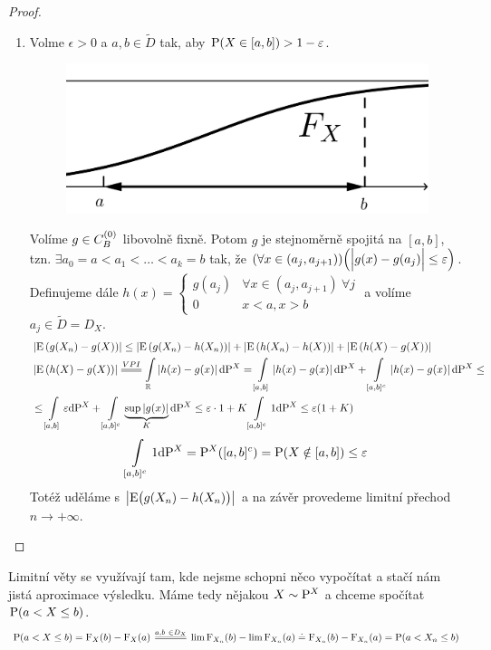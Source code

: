 \begin{theorem}
\begin{proof}
\begin{enumerate}[	$\Rightarrow$:]
		\end{enumerate}
	\begin{enumerate}[	$\Leftarrow$:]
	\item Volme $\epsilon>0$ a $a,b\in\tilde{D}$ tak, aby $\PP(X\in[a,b])>1-\epsilon$.
		\begin{figure}[h]
		\centering
		\includegraphics[width=0.3\linewidth]{veta3}
		\label{fig:veta3}
	\end{figure}
	 Volíme $g\in\CB$ libovolně fixně. Potom $g$ je stejnoměrně spojitá na $[a,b]$, tzn. $\exists a_0=a<a_1<\dots<a_k=b$ tak, že $(\forall x\in(a_j,a_{j+1}))\Bigl( \Bigl| g(x)-g(a_j) \Bigr|\leq \epsilon \Bigr)$. Definujeme dále $h(x)=\begin{cases}
	g(a_j) &\forall x\in(a_j,a_{j+1})~ \forall j \\ 0 & x<a,x>b
	\end{cases}$ a volíme $a_j\in\tilde{D}=D_X$.
	\[
	\begin{split}
	&\left| \E \left( g(X_n)-g(X) \right) \right|\leq \left| \E \left( g(X_n)-h(X_n) \right) \right|+ \left| \E \left( h(X_n)-h(X) \right) \right|+\left| \E \left( h(X)-g(X) \right) \right| \\ 
	& \left| \E \left( h(X)-g(X) \right) \right|\equal{VPI}\int\limits_{\R} \left| h(x)-g(x) \right|\dif\PP^X=\int\limits_{[a,b]}\left| h(x)-g(x) \right|\dif\PP^X+\int\limits_{[a,b]^c}\left| h(x)-g(x) \right|\dif\PP^X \leq \\ &\leq\int\limits_{[a,b]}\epsilon \dif\PP^X+\int\limits_{[a,b]^c}\underbrace{\sup|g(x)|}_{K}\dif\PP^X\leq \epsilon\cdot 1+K\int\limits_{[a,b]^c}1\dif\PP^X\leq \epsilon(1+K)  
	\end{split}
	\] 
	$$\int\limits_{[a,b]^c}1\dif\PP^X= \PP^X([a,b]^c)=\PP(X \notin [a,b])\leq \epsilon $$
	Totéž uděláme s $\left| \E \br{ g(X_n)-h(X_n)}  \right|$ a na závěr provedeme limitní přechod $n\to+\infty$.
\end{enumerate}
	\end{proof}
\end{theorem}
\begin{remark}
	Limitní věty se využívají tam, kde nejsme schopni něco vypočítat a stačí nám jistá aproximace výsledku. Máme tedy nějakou $ X\sim \PP^X $ a chceme spočítat\newline  $\PP(a<X\leq b)$.
	$$\PP(a<X\leq b)=\FF_X(b)-\FF_X(a)\equal{a,b~\in D_X}\lim \FF_{X_n}(b)-\lim \FF_{X_n}(a)\doteq \FF_{X_n}(b)-\FF_{X_n}(a)=\PP(a<X_n\leq b)$$
\end{remark}
